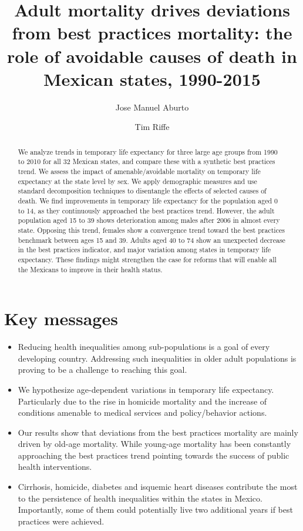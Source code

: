 \documentclass{article}
\title{ Adult mortality drives deviations from best practices mortality: the role of avoidable causes of death in Mexican states, 1990-2015}
\author[1]{Jose Manuel Aburto}
\author[2]{Tim Riffe}
\affil[1]{European Doctoral School of Demography}
\affil[1,2]{Max Planck Institute for Demographic Research}
\begin{document}
\maketitle

\begin{abstract}
We analyze trends in temporary life expectancy for three large age groups from 1990 to 2010 for all 32 Mexican states, and compare these with a synthetic best practices trend. We assess the impact of amenable/avoidable mortality on temporary life expectancy at the state level by sex. We apply demographic measures and use standard decomposition techniques to disentangle the effects of selected causes of death. We find improvements in temporary life expectancy for the population aged 0 to 14, as they continuously approached the best practices trend. However, the adult population aged 15 to 39 shows deterioration among males after 2006 in almost every state. Opposing this trend, females show a convergence trend toward the best practices benchmark between ages 15 and 39. Adults aged 40 to 74 show an unexpected decrease in the best practices indicator, and major variation among states in temporary life expectancy. These findings might strengthen the case for reforms that will enable all the Mexicans to improve in their health status.
​



\end{abstract}

\section*{Key messages}
\begin{itemize}
\item Reducing health inequalities among sub-populations is a goal of every developing country. Addressing such inequalities in older adult populations is proving to be a challenge to reaching this goal.
\item We hypothesize age-dependent variations in temporary life expectancy. Particularly due to the rise in homicide mortality and the increase of conditions amenable to medical services and policy/behavior actions.
\item Our results show that deviations from the best practices mortality are mainly driven by old-age mortality. While young-age mortality has been constantly approaching the best practices trend pointing towards the success of public health interventions.
\item Cirrhosis, homicide, diabetes and isquemic heart diseases contribute the most to the persistence of health inequalities within the states in Mexico. Importantly, some of them could potentially live two additional years if best practices were achieved. 
\end{itemize}
\end{document}

